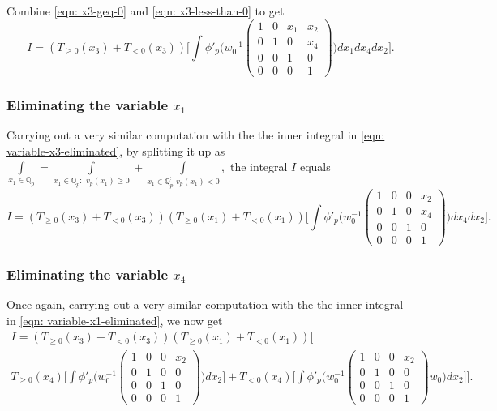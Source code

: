 \documentclass[11pt]{amsart}
\begin{document}
Combine \eqref{eqn: x3-geq-0} and \eqref{eqn: x3-less-than-0} to get
\begin{equation}
	I = \left(T_{\geq 0}(x_3) + T_{< 0 }(x_3) \right)\biggl[ \int \phi'_p \biggl( w_0^{-1}\left(\begin{smallmatrix}
		1 & 0 & x_{1} & x_{2} \\
		0 & 1 & 0 & x_{4} \\
		0 & 0 & 1 & 0 \\
		0 & 0 & 0 & 1
	\end{smallmatrix}\right)  \biggr) dx_1 dx_4 dx_2\biggr]. \label{eqn: variable-x3-eliminated}
\end{equation}

\medskip
\subsubsection{Eliminating the variable $x_1$}
Carrying out a very similar computation with the the inner integral in \eqref{eqn: variable-x3-eliminated}, by splitting it up as 
$\int\limits_{x_1 \in \mathbb{Q}_p} = \int\limits_{x_1 \in \mathbb{Q}_p:\,\, v_p(x_1) \geq 0} + \int\limits_{x_1 \in \mathbb{Q}_p^:\,\, v_p(x_1) < 0 },$ 
 the integral $I$ equals
\begin{equation}
	I = (T_{\geq 0}(x_3) + T_{<0}(x_3))(T_{\geq 0}(x_1) + T_{<0}(x_1)) \biggl[ \int \phi'_p \biggl( w_0^{-1}\left(\begin{smallmatrix}
		1 & 0 & 0 & x_{2} \\
		0 & 1 & 0 & x_{4} \\
		0 & 0 & 1 & 0 \\
		0 & 0 & 0 & 1
	\end{smallmatrix}\right)   \biggr) dx_4 dx_2 \biggr]. \label{eqn: variable-x1-eliminated}
\end{equation}


\medskip
\subsubsection{Eliminating the variable $x_4$}
Once again, carrying out a very similar computation with the the inner integral in \eqref{eqn: variable-x1-eliminated}, we now get
\begin{multline}
	I = (T_{\geq 0}(x_3) + T_{<0}(x_3))(T_{\geq 0}(x_1) + T_{<0}(x_1)) \bigl[ \\ T_{\geq 0}(x_4) \biggl[ \int \phi'_p \biggl( w_0^{-1}\left(\begin{smallmatrix}
		1 & 0 & 0 & x_{2} \\
		0 & 1 & 0 & 0 \\
		0 & 0 & 1 & 0 \\
		0 & 0 & 0 & 1
	\end{smallmatrix}\right)   \biggr) dx_2 \biggr] + T_{< 0}(x_4) \biggl[ \int \phi'_p \biggl( w_0^{-1}\left(\begin{smallmatrix}
		1 & 0 & 0 & x_{2} \\
		0 & 1 & 0 & 0 \\
		0 & 0 & 1 & 0 \\
		0 & 0 & 0 & 1
	\end{smallmatrix}\right)  w_0  \biggr) dx_2 \biggr] \bigr]. \label{eqn: variable-x4-eliminated}
\end{multline}
\end{document}
